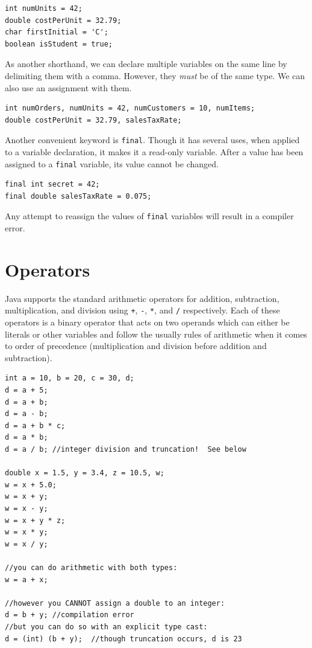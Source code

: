 \begin{verbatim}
int numUnits = 42;
double costPerUnit = 32.79;
char firstInitial = 'C';
boolean isStudent = true;
\end{verbatim}

As another shorthand, we can declare multiple variables on the same line by delimiting
them with a comma.  However, they \emph{must} be of the same type.  We can also 
use an assignment with them. 

\begin{verbatim}
int numOrders, numUnits = 42, numCustomers = 10, numItems;
double costPerUnit = 32.79, salesTaxRate;
\end{verbatim}

Another convenient keyword is \texttt{final}.  Though it has several uses, 
when applied to a variable declaration, it makes it a read-only variable.  After a
value has been assigned to a \texttt{final} variable, its value cannot
be changed.  

\begin{verbatim}
final int secret = 42;
final double salesTaxRate = 0.075;
\end{verbatim}

Any attempt to reassign the values of \texttt{final} variables will result
in a compiler error.

\section{Operators}

Java supports the standard arithmetic operators for addition, subtraction, multiplication, and
division using \texttt{+}, \texttt{-}, \texttt{*}, and
\texttt{/} respectively.  Each of these operators is a binary operator that
acts on two operands which can either be literals or other variables and follow
the usually rules of arithmetic when it comes to order of precedence (multiplication 
and division before addition and subtraction).

\begin{verbatim}
int a = 10, b = 20, c = 30, d;
d = a + 5;
d = a + b;
d = a - b;
d = a + b * c;
d = a * b;
d = a / b; //integer division and truncation!  See below

double x = 1.5, y = 3.4, z = 10.5, w;
w = x + 5.0;
w = x + y;
w = x - y;
w = x + y * z;
w = x * y;
w = x / y;

//you can do arithmetic with both types:
w = a + x;

//however you CANNOT assign a double to an integer:
d = b + y; //compilation error
//but you can do so with an explicit type cast:
d = (int) (b + y);  //though truncation occurs, d is 23
\end{verbatim}

